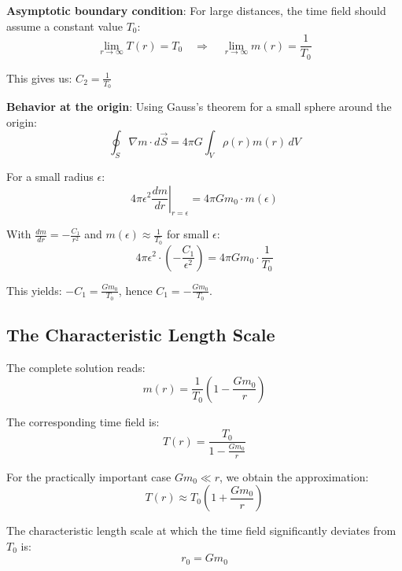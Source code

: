 	\textbf{Asymptotic boundary condition}: For large distances, the time field should assume a constant value $T_0$:
	\begin{equation}
		\lim_{r \to \infty} T(r) = T_0 \quad \Rightarrow \quad \lim_{r \to \infty} m(r) = \frac{1}{T_0}
	\end{equation}
	
	This gives us: $C_2 = \frac{1}{T_0}$
	
	\textbf{Behavior at the origin}: Using Gauss's theorem \citep{griffiths1999,jackson1998} for a small sphere around the origin:
	\begin{equation}
		\oint_S \nabla m \cdot d\vec{S} = 4\pi G \int_V \rho(r) m(r) \, dV
	\end{equation}
	
	For a small radius $\epsilon$:
	\begin{equation}
		4\pi \epsilon^2 \left.\frac{dm}{dr}\right|_{r=\epsilon} = 4\pi G m_0 \cdot m(\epsilon)
	\end{equation}
	
	With $\frac{dm}{dr} = -\frac{C_1}{r^2}$ and $m(\epsilon) \approx \frac{1}{T_0}$ for small $\epsilon$:
	\begin{equation}
		4\pi \epsilon^2 \cdot \left(-\frac{C_1}{\epsilon^2}\right) = 4\pi G m_0 \cdot \frac{1}{T_0}
	\end{equation}
	
	This yields: $-C_1 = \frac{G m_0}{T_0}$, hence $C_1 = -\frac{G m_0}{T_0}$.
	
	\subsection{The Characteristic Length Scale}
	\label{subsec:characteristic_length}
	
	The complete solution reads:
	\begin{equation}
		m(r) = \frac{1}{T_0}\left(1 - \frac{G m_0}{r}\right)
	\end{equation}
	
	The corresponding time field is:
	\begin{equation}
		T(r) = \frac{T_0}{1 - \frac{G m_0}{r}}
	\end{equation}
	
	For the practically important case $G m_0 \ll r$, we obtain the approximation:
	\begin{equation}
		T(r) \approx T_0\left(1 + \frac{G m_0}{r}\right)
	\end{equation}
	
	The characteristic length scale at which the time field significantly deviates from $T_0$ is:
	\begin{equation}
		\boxed{r_0 = G m_0}
	\end{equation}
	
